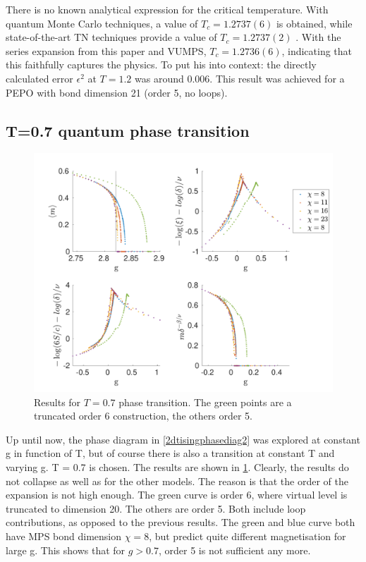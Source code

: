 There is no known analytical expression for the critical temperature. With quantum Monte Carlo techniques, a value of $T_c=1.2737(6)$ is obtained, while state-of-the-art \Gls{TN} techniques provide a value of $T_c=1.2737(2)$ \cite{Czarnik2019}. With the series expansion from this paper and \Gls{VUMPS}, $T_c=1.2736(6)$, indicating that this faithfully captures the physics. To put his into context: the directly calculated error $\epsilon^{2}$  at $T=1.2$ was around $0.006$. This result was achieved for a PEPO with bond dimension 21 (order 5, no loops).

\subsection{T=0.7 quantum phase transition}\label{tphasetranssubsec}

\begin{figure}[h!]
    \center
    \includegraphics[width=\textwidth]{Figuren/phasediag/t07/full.pdf}
    \caption{Results for $T=0.7$ phase transition. The green points are a truncated order 6 construction, the others order 5.  }
    \label{fig:phase:t07:full}
\end{figure}

Up until now, the phase diagram in \cref{2dtisingphasediag2} was explored at constant g in function of T, but of course there is also a transition at constant T and varying g.  T = 0.7 is chosen. The results are shown in \cref{fig:phase:t07:full}. Clearly, the results do not collapse as well as for the other models. The reason is that the order of the expansion is not high enough. The green curve is order 6, where virtual level is truncated to dimension 20. The others are order 5. Both include loop contributions, as opposed to the previous results. The green and blue curve both have \Gls{MPS} bond dimension $\chi=8$, but predict quite different magnetisation for large g. This shows that for $g>0.7$, order 5 is not sufficient any more.

